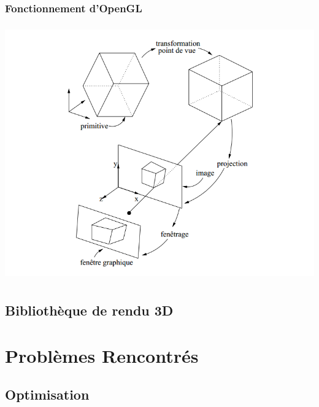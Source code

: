 \documentclass{report}
\begin{document}
\section{Fonctionnement d'OpenGL}
\begin{center}
	 \includegraphics[height=11cm]{img/Fonctionnement}
 \end{center}



\newpage

\chapter{Bibliothèque de rendu 3D}

\part{Problèmes Rencontrés}

\chapter{Optimisation}
\newpage
\end{document}
